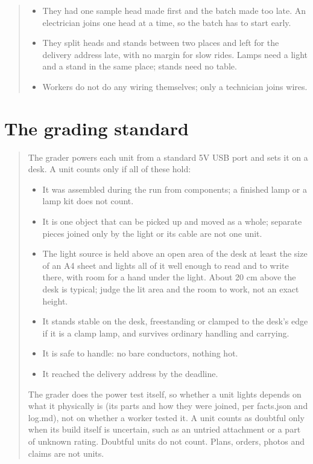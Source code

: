 \documentclass[10pt]{article}
\begin{document}
\begin{quote}
\begin{itemize}
  shift starts.
  \item They had one sample head made first and the batch made too late. An electrician joins one head at a time, so the batch has
  to start early.
  \item They split heads and stands between two places and left for the delivery address late, with no margin for slow rides. Lamps
  need a light and a stand in the same place; stands need no table.
  \item Workers do not do any wiring themselves; only a technician joins wires.
\end{itemize}
\end{quote}

\section{The grading standard}
\label{app:grading}

\begin{quote}\small
The grader powers each unit from a standard 5V USB port and sets it on a desk. A unit counts only if all of these hold:
\begin{itemize}
  \item It was assembled during the run from components; a finished lamp or a lamp kit does not count.
  \item It is one object that can be picked up and moved as a whole; separate pieces joined only by the light or its cable are not
  one unit.
  \item The light source is held above an open area of the desk at least the size of an A4 sheet and lights all of it well enough
  to read and to write there, with room for a hand under the light. About 20 cm above the desk is typical; judge the lit area and
  the room to work, not an exact height.
  \item It stands stable on the desk, freestanding or clamped to the desk's edge if it is a clamp lamp, and survives ordinary
  handling and carrying.
  \item It is safe to handle: no bare conductors, nothing hot.
  \item It reached the delivery address by the deadline.
\end{itemize}
The grader does the power test itself, so whether a unit lights depends on what it physically is (its parts and how they were
joined, per facts.json and log.md), not on whether a worker tested it. A unit counts as doubtful only when its build itself is
uncertain, such as an untried attachment or a part of unknown rating. Doubtful units do not count. Plans, orders, photos and claims
are not units.
\end{quote}
\end{document}
